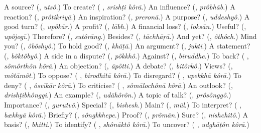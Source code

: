 \begin{tcolorbox}[breakable,colback=teal!4,colframe=teal!35!black,title={Before you move on}]
A source? (\textbf{}, \emph{utsô}.) To create? (\textbf{ }, \emph{srishṭi kôrā}.) An influence? (\textbf{}, \emph{prôbhāb}.) A reaction? (\textbf{}, \emph{prôtikriyā}.) An inspiration? (\textbf{}, \emph{preronā}.) A purpose? (\textbf{}, \emph{uddeshyô}.) A good turn? (\textbf{}, \emph{upôkār}.) A profit? (\textbf{}, \emph{lābh}.) A financial loss? (\textbf{}, \emph{loksān}.) Useful? (\textbf{}, \emph{upôjogī}.) Therefore? (\textbf{}, \emph{sutôrāng}.) Besides? (\textbf{}, \emph{tāchhāṛā}.) And yet? (\textbf{}, \emph{ôthôch}.) Mind you? (\textbf{}, \emph{ôbôshyô}.) To hold good? (\textbf{}, \emph{khāṭā}.) An argument? (\textbf{}, \emph{jukti}.) A statement? (\textbf{}, \emph{bôktôbyô}.) A side in a dispute? (\textbf{}, \emph{pôkkhô}.) Against? (\textbf{}, \emph{biruddhe}.) To back? (\textbf{ }, \emph{sômôrthôn kôrā}.) An objection? (\textbf{}, \emph{āpôtti}.) A debate? (\textbf{}, \emph{bitôrkô}.) Views? (\textbf{}, \emph{môtāmôt}.) To oppose? (\textbf{ }, \emph{birodhitā kôrā}.) To disregard? (\textbf{ }, \emph{upekkhā kôrā}.) To deny? (\textbf{ }, \emph{ôsvīkār kôrā}.) To criticise? (\textbf{ }, \emph{sômālochônā kôrā}.) An outlook? (\textbf{}, \emph{drishṭibhônggi}.) An example? (\textbf{}, \emph{udāhôrôn}.) A topic of talk? (\textbf{}, \emph{prôsônggô}.) Importance? (\textbf{}, \emph{gurutvô}.) Special? (\textbf{}, \emph{bishesh}.) Main? (\textbf{}, \emph{mūl}.) To interpret? (\textbf{ }, \emph{bækhyā kôrā}.) Briefly? (\textbf{}, \emph{sôngkkhepe}.) Proof? (\textbf{}, \emph{prômān}.) Sure? (\textbf{}, \emph{nishchitô}.) A basis? (\textbf{}, \emph{bhitti}.) To identify? (\textbf{ }, \emph{shônāktô kôrā}.) To uncover? (\textbf{ }, \emph{udghāṭôn kôrā}.)
\end{tcolorbox}
